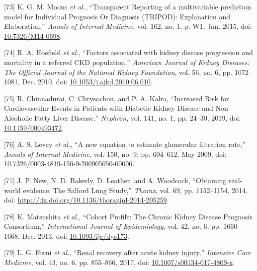 \documentclass[12pt,PhD,twoside,openright]{muthesis}
\newenvironment{cslreferences}%
  {}%
  {\par}
\begin{document}
\begin{cslreferences}
\leavevmode\hypertarget{ref-moons_transparent_2015}{}%
{[}73{]} K. G. M. Moons \emph{et al.}, ``Transparent Reporting of a multivariable prediction model for Individual Prognosis Or Diagnosis (TRIPOD): Explanation and Elaboration,'' \emph{Annals of Internal Medicine}, vol. 162, no. 1, p. W1, Jan. 2015, doi: \href{https://doi.org/10.7326/M14-0698}{10.7326/M14-0698}.

\leavevmode\hypertarget{ref-hoefield_factors_2010}{}%
{[}74{]} R. A. Hoefield \emph{et al.}, ``Factors associated with kidney disease progression and mortality in a referred CKD population,'' \emph{American Journal of Kidney Diseases: The Official Journal of the National Kidney Foundation}, vol. 56, no. 6, pp. 1072--1081, Dec. 2010, doi: \href{https://doi.org/10.1053/j.ajkd.2010.06.010}{10.1053/j.ajkd.2010.06.010}.

\leavevmode\hypertarget{ref-chinnadurai_increased_2019-1}{}%
{[}75{]} R. Chinnadurai, C. Chrysochou, and P. A. Kalra, ``Increased Risk for Cardiovascular Events in Patients with Diabetic Kidney Disease and Non-Alcoholic Fatty Liver Disease,'' \emph{Nephron}, vol. 141, no. 1, pp. 24--30, 2019, doi: \href{https://doi.org/10.1159/000493472}{10.1159/000493472}.

\leavevmode\hypertarget{ref-levey_new_2009}{}%
{[}76{]} A. S. Levey \emph{et al.}, ``A new equation to estimate glomerular filtration rate,'' \emph{Annals of Internal Medicine}, vol. 150, no. 9, pp. 604--612, May 2009, doi: \href{https://doi.org/10.7326/0003-4819-150-9-200905050-00006}{10.7326/0003-4819-150-9-200905050-00006}.

\leavevmode\hypertarget{ref-new_obtaining_2014}{}%
{[}77{]} J. P. New, N. D. Bakerly, D. Leather, and A. Woodcock, ``Obtaining real-world evidence: The Salford Lung Study,'' \emph{Thorax}, vol. 69, pp. 1152--1154, 2014, doi: \href{https://doi.org/http://dx.doi.org/10.1136/thoraxjnl-2014-205259}{http://dx.doi.org/10.1136/thoraxjnl-2014-205259}.

\leavevmode\hypertarget{ref-matsushita_cohort_2013}{}%
{[}78{]} K. Matsushita \emph{et al.}, ``Cohort Profile: The Chronic Kidney Disease Prognosis Consortium,'' \emph{International Journal of Epidemiology}, vol. 42, no. 6, pp. 1660--1668, Dec. 2013, doi: \href{https://doi.org/10.1093/ije/dys173}{10.1093/ije/dys173}.

\leavevmode\hypertarget{ref-forni_renal_2017-1}{}%
{[}79{]} L. G. Forni \emph{et al.}, ``Renal recovery after acute kidney injury,'' \emph{Intensive Care Medicine}, vol. 43, no. 6, pp. 855--866, 2017, doi: \href{https://doi.org/10.1007/s00134-017-4809-x}{10.1007/s00134-017-4809-x}.


\end{cslreferences}
\end{document}
